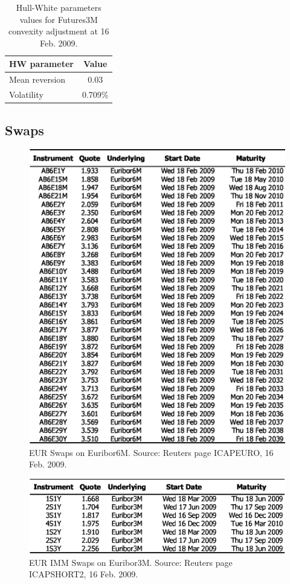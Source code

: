 \documentclass[11pt,reqno]{amsart}
\begin{document}
\begin{table}[tbp]
\begin{tabular}{lc}
\midrule
HW parameter   & Value \\
\midrule
Mean reversion & 0.03  \\
Volatility & 0.709\%   \\
\midrule
\end{tabular}
\caption{Hull-White parameters values for Futures3M convexity adjustment at 16 Feb. 2009.}
\label{tab:FuturesConAdy}
\end{table}


\subsection{Swaps}
\label{sec:Swap}

\begin{figure}[tbp]
\centering
\includegraphics[scale=0.9]{./FigMktSwaps6M}
\caption{EUR Swaps on Euribor6M. Source: Reuters page ICAPEURO, 16 Feb. 2009.}
\label{fig:Swaps6M}
\end{figure}

\begin{figure}[tbp]
\centering
\includegraphics[scale=0.9]{./FigMktSwapsIMM}
\caption{EUR IMM Swaps on Euribor3M. Source: Reuters page ICAPSHORT2, 16 Feb. 2009.}
\label{fig:SwapsIMM}
\end{figure}
\end{document}
